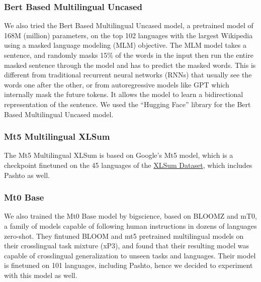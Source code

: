 \subsubsection{Bert Based Multilingual Uncased}
We also tried the Bert Based Multilingual Uncased model, a pretrained model of 168M (million) parameters, on the top 102 languages with the largest Wikipedia using a masked language modeling (MLM) objective. The MLM model takes a sentence, and randomly masks 15\% of the words in the input then run the entire masked sentence through the model and has to predict the masked words. This is different from traditional recurrent neural networks (RNNs) that usually see the words one after the other, or from autoregressive models like GPT which internally mask the future tokens. It allows the model to learn a bidirectional representation of the sentence. We used the ``Hugging Face'' library for the Bert Based Multilingual Uncased model.

\subsubsection{Mt5 Multilingual XLSum} 
The Mt5 Multilingual XLSum is based on Google's Mt5 model, which is a checkpoint finetuned on the 45 languages of the \href{https://huggingface.co/datasets/csebuetnlp/xlsum}{XLSum Dataset}, which includes Pashto as well. 

\subsubsection{Mt0 Base}
We also trained the Mt0 Base model by bigscience, based on BLOOMZ and mT0, a family of models capable of following human instructions in dozens of languages zero-shot. They fintuned BLOOM and mt5 pretrained multilingual models on their crosslingual task mixture (xP3), and found that their resulting model was capable of crosslingual generalization to unseen tasks and languages. Their model is finetuned on 101 languages, including Pashto, hence we decided to experiment with this model as well.